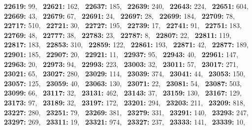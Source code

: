 \textbf{22619:} 99,\allowbreak~ 
\textbf{22621:} 162,\allowbreak~ 
\textbf{22637:} 185,\allowbreak~ 
\textbf{22639:} 240,\allowbreak~ 
\textbf{22643:} 224,\allowbreak~ 
\textbf{22651:} 604,\allowbreak~ 
\textbf{22669:} 43,\allowbreak~ 
\textbf{22679:} 67,\allowbreak~ 
\textbf{22691:} 24,\allowbreak~ 
\textbf{22697:} 28,\allowbreak~ 
\textbf{22699:} 184,\allowbreak~ 
\textbf{22709:} 78,\allowbreak~ 
\textbf{22717:} 510,\allowbreak~ 
\textbf{22721:} 30,\allowbreak~ 
\textbf{22727:} 195,\allowbreak~ 
\textbf{22739:} 17,\allowbreak~ 
\textbf{22741:} 91,\allowbreak~ 
\textbf{22751:} 183,\allowbreak~ 
\textbf{22769:} 48,\allowbreak~ 
\textbf{22777:} 38,\allowbreak~ 
\textbf{22783:} 23,\allowbreak~ 
\textbf{22787:} 8,\allowbreak~ 
\textbf{22807:} 22,\allowbreak~ 
\textbf{22811:} 119,\allowbreak~ 
\textbf{22817:} 183,\allowbreak~ 
\textbf{22853:} 310,\allowbreak~ 
\textbf{22859:} 122,\allowbreak~ 
\textbf{22861:} 193,\allowbreak~ 
\textbf{22871:} 42,\allowbreak~ 
\textbf{22877:} 189,\allowbreak~ 
\textbf{22901:} 185,\allowbreak~ 
\textbf{22907:} 20,\allowbreak~ 
\textbf{22921:} 11,\allowbreak~ 
\textbf{22937:} 95,\allowbreak~ 
\textbf{22943:} 40,\allowbreak~ 
\textbf{22961:} 147,\allowbreak~ 
\textbf{22963:} 20,\allowbreak~ 
\textbf{22973:} 94,\allowbreak~ 
\textbf{22993:} 223,\allowbreak~ 
\textbf{23003:} 32,\allowbreak~ 
\textbf{23011:} 57,\allowbreak~ 
\textbf{23017:} 271,\allowbreak~ 
\textbf{23021:} 65,\allowbreak~ 
\textbf{23027:} 280,\allowbreak~ 
\textbf{23029:} 114,\allowbreak~ 
\textbf{23039:} 374,\allowbreak~ 
\textbf{23041:} 44,\allowbreak~ 
\textbf{23053:} 150,\allowbreak~ 
\textbf{23057:} 125,\allowbreak~ 
\textbf{23059:} 40,\allowbreak~ 
\textbf{23063:} 130,\allowbreak~ 
\textbf{23071:} 22,\allowbreak~ 
\textbf{23081:} 54,\allowbreak~ 
\textbf{23087:} 503,\allowbreak~ 
\textbf{23099:} 66,\allowbreak~ 
\textbf{23117:} 32,\allowbreak~ 
\textbf{23131:} 462,\allowbreak~ 
\textbf{23143:} 37,\allowbreak~ 
\textbf{23159:} 130,\allowbreak~ 
\textbf{23167:} 129,\allowbreak~ 
\textbf{23173:} 97,\allowbreak~ 
\textbf{23189:} 32,\allowbreak~ 
\textbf{23197:} 172,\allowbreak~ 
\textbf{23201:} 294,\allowbreak~ 
\textbf{23203:} 211,\allowbreak~ 
\textbf{23209:} 818,\allowbreak~ 
\textbf{23227:} 280,\allowbreak~ 
\textbf{23251:} 79,\allowbreak~ 
\textbf{23269:} 381,\allowbreak~ 
\textbf{23279:} 331,\allowbreak~ 
\textbf{23291:} 140,\allowbreak~ 
\textbf{23293:} 247,\allowbreak~ 
\textbf{23297:} 269,\allowbreak~ 
\textbf{23311:} 19,\allowbreak~ 
\textbf{23321:} 974,\allowbreak~ 
\textbf{23327:} 237,\allowbreak~ 
\textbf{23333:} 141,\allowbreak~ 
\textbf{23339:} 10,\allowbreak~ 

